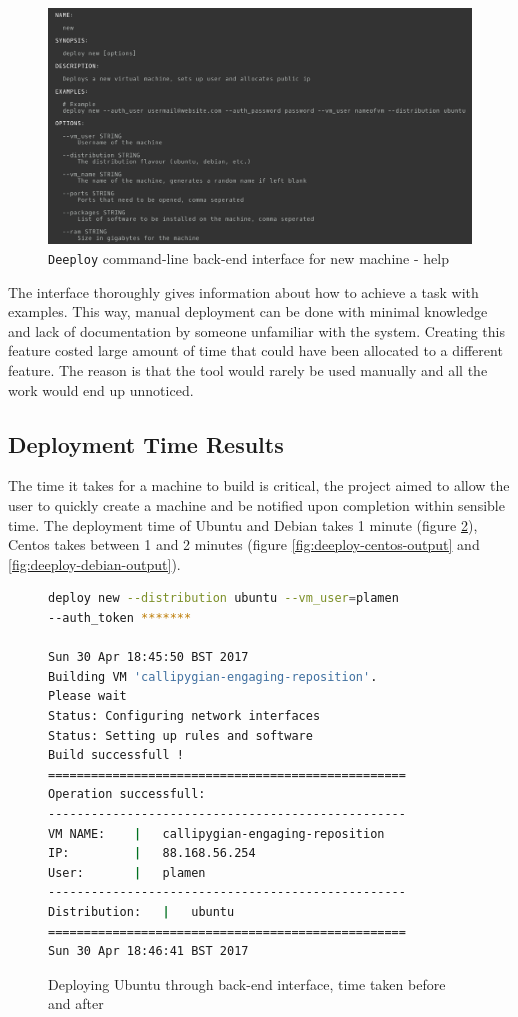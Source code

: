 \documentclass{article}
\begin{document}
\begin{figure}[h!]
\vspace{0.5cm}
\includegraphics[width=12cm]{deeploy_new_help_cli}
\vspace{0.5cm}
\caption{\texttt{Deeploy} command-line back-end interface for new machine - help}
\label{fig:deeploy-new-help}
\end{figure}

The interface thoroughly gives information about how to achieve a task with examples. This way, manual deployment can be done with minimal knowledge and lack of documentation by someone unfamiliar with the system. Creating this feature costed large amount of time that could have been allocated to a different feature. The reason is that the tool would rarely be used manually and all the work would end up unnoticed.

\subsection{Deployment Time Results}
The time it takes for a machine to build is critical, the project aimed to allow the user to quickly create a machine and be notified upon completion within sensible time. The deployment time of Ubuntu and Debian takes 1 minute (figure \ref{fig:deeploy-ubuntu-output}), Centos takes between 1 and 2 minutes (figure \ref{fig:deeploy-centos-output} and  \ref{fig:deeploy-debian-output}). 

\begin{figure}[h!]
\begin{lstlisting}[frame=single, language=Bash]
deploy new --distribution ubuntu --vm_user=plamen 
--auth_token *******

Sun 30 Apr 18:45:50 BST 2017
Building VM 'callipygian-engaging-reposition'.
Please wait 
Status: Configuring network interfaces
Status: Setting up rules and software
Build successfull !
==================================================
Operation successfull:
--------------------------------------------------
VM NAME:	|	callipygian-engaging-reposition
IP:			|	88.168.56.254
User:		|	plamen
--------------------------------------------------
Distribution:	|	ubuntu
==================================================
Sun 30 Apr 18:46:41 BST 2017
\end{lstlisting}
\caption{Deploying Ubuntu through back-end interface, time taken before and after}
\label{fig:deeploy-ubuntu-output}
\end{figure}
\end{document}
